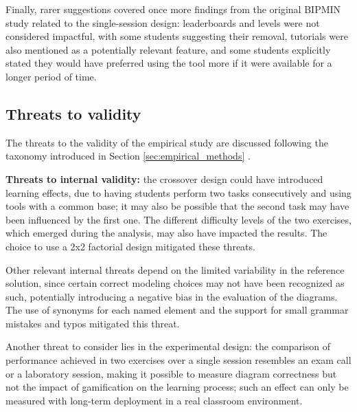Finally, rarer suggestions covered once more findings from the original BIPMIN study related to the single-session design: leaderboards and levels were not considered impactful, with some students suggesting their removal, tutorials were also mentioned as a potentially relevant feature, and some students explicitly stated they would have preferred using the tool more if it were available for a longer period of time.


\subsection{Threats to validity}

The threats to the validity of the empirical study are discussed following the taxonomy introduced in Section \ref{sec:empirical_methods} \cite{wohlin2012experimentation}.

\textbf{Threats to internal validity:} the crossover design could have introduced learning effects, due to having students perform two tasks consecutively and using tools with a common base; it may also be possible that the second task may have been influenced by the first one. The different difficulty levels of the two exercises, which emerged during the analysis, may also have impacted the results. The choice to use a 2x2 factorial design mitigated these threats. 

Other relevant internal threats depend on the limited variability in the reference solution, since certain correct modeling choices may not have been recognized as such, potentially introducing a negative bias in the evaluation of the diagrams. The use of synonyms for each named element and the support for small grammar mistakes and typos mitigated this threat.

Another threat to consider lies in the experimental design: the comparison of performance achieved in two exercises over a single session resembles an exam call or a laboratory session, making it possible to measure diagram correctness but not the impact of gamification on the learning process; such an effect can only be measured with long-term deployment in a real classroom environment. 

